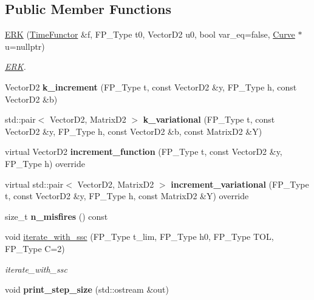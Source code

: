 \subsection*{Public Member Functions}
\begin{DoxyCompactItemize}
\item 
\hyperlink{classERK_a354218adfe6be3dd211d263524cdda94}{E\+RK} (\hyperlink{classTimeFunctor}{Time\+Functor} \&f, F\+P\+\_\+\+Type t0, Vector\+D2 u0, bool var\+\_\+eq=false, \hyperlink{classCurve}{Curve} $\ast$u=nullptr)
\begin{DoxyCompactList}\small\item\em \hyperlink{classERK}{E\+RK}. \end{DoxyCompactList}\item 
\mbox{\label{classERK_ab3dcc059386d02ae76f229dba8909ad3}} 
Vector\+D2 {\bfseries k\+\_\+increment} (F\+P\+\_\+\+Type t, const Vector\+D2 \&y, F\+P\+\_\+\+Type h, const Vector\+D2 \&b)
\item 
\mbox{\label{classERK_a93428c63320ddc6ec072eb737bf57ba3}} 
std\+::pair$<$ Vector\+D2, Matrix\+D2 $>$ {\bfseries k\+\_\+variational} (F\+P\+\_\+\+Type t, const Vector\+D2 \&y, F\+P\+\_\+\+Type h, const Vector\+D2 \&b, const Matrix\+D2 \&Y)
\item 
\mbox{\label{classERK_afdc6a96a8264b23acdeb0d2a31b42f8d}} 
virtual Vector\+D2 {\bfseries increment\+\_\+function} (F\+P\+\_\+\+Type t, const Vector\+D2 \&y, F\+P\+\_\+\+Type h) override
\item 
\mbox{\label{classERK_adac215657421b485e20292f0793b8611}} 
virtual std\+::pair$<$ Vector\+D2, Matrix\+D2 $>$ {\bfseries increment\+\_\+variational} (F\+P\+\_\+\+Type t, const Vector\+D2 \&y, F\+P\+\_\+\+Type h, const Matrix\+D2 \&Y) override
\item 
\mbox{\label{classERK_ae3f71b3f5364ffcab63a715d95adb911}} 
size\+\_\+t {\bfseries n\+\_\+misfires} () const
\item 
void \hyperlink{classERK_a4f4ae1888656dbbf03f3cc9d22177f7e}{iterate\+\_\+with\+\_\+ssc} (F\+P\+\_\+\+Type t\+\_\+lim, F\+P\+\_\+\+Type h0, F\+P\+\_\+\+Type T\+OL, F\+P\+\_\+\+Type C=2)
\begin{DoxyCompactList}\small\item\em iterate\+\_\+with\+\_\+ssc \end{DoxyCompactList}\item 
\mbox{\label{classERK_a6057b70fbd97bbe2e5b2d0233aef46a4}} 
void {\bfseries print\+\_\+step\+\_\+size} (std\+::ostream \&out)
\end{DoxyCompactItemize}


